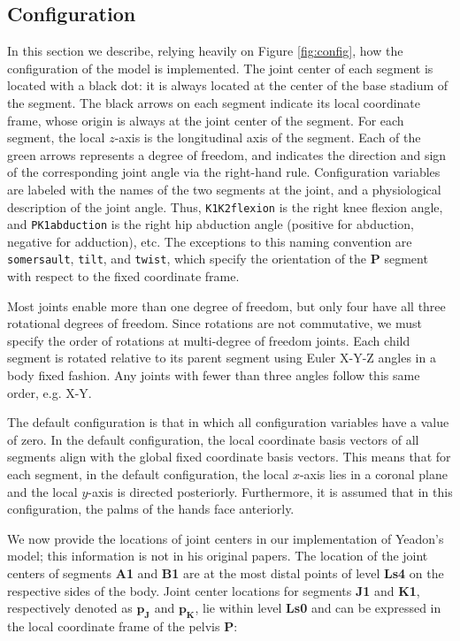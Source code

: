 \documentclass[10pt,a4paper,twocolumn]{article}
\begin{document}
\subsection*{Configuration}

In this section we describe, relying heavily on Figure \ref{fig:config}, how
the configuration of the model is implemented. The joint center of each segment
is located with a black dot: it is always located at the center of the base
stadium of the segment. The black arrows on each segment indicate its local
coordinate frame, whose origin is always at the joint center of the segment.
For each segment, the local $z$-axis is the longitudinal axis of the segment.
Each of the green arrows represents a degree of freedom, and indicates the
direction and sign of the corresponding joint angle via the right-hand rule.
Configuration variables are labeled with the names of the two segments at the
joint, and a physiological description of the joint angle. Thus,
\verb+K1K2flexion+ is the right knee flexion angle, and \verb+PK1abduction+ is
the right hip abduction angle (positive for abduction, negative for adduction),
etc. The exceptions to this naming convention are \verb+somersault+,
\verb+tilt+, and \verb+twist+, which specify the orientation of the \textbf{P}
segment with respect to the fixed coordinate frame.

Most joints enable more than one degree of freedom, but only four have all
three rotational degrees of freedom. Since rotations are not commutative,  we
must specify the order of rotations at multi-degree of freedom joints. Each
child segment is rotated relative to its parent segment using Euler X-Y-Z
angles in a body fixed fashion. Any joints with fewer than three angles follow
this same order, e.g. X-Y.

The default configuration is that in which all configuration variables have a
value of zero. In the default configuration, the local coordinate basis vectors
of all segments align with the global fixed coordinate basis vectors. This
means that for each segment, in the default configuration, the local $x$-axis
lies in a coronal plane and the local $y$-axis is directed posteriorly.
Furthermore, it is assumed that in this configuration, the palms of the hands
face anteriorly.

We now provide the locations of joint centers in our implementation of Yeadon's
model; this information is not in his original papers. The location of the
joint centers of segments \textbf{A1} and \textbf{B1} are at the most distal
points of level \textbf{Ls4} on the respective sides of the body. Joint center
locations for segments \textbf{J1} and \textbf{K1}, respectively denoted as
$\mathbf{p_J}$ and $\mathbf{p_K}$, lie within level \textbf{Ls0} and can be
expressed in the local coordinate frame of the pelvis \textbf{P}:
\end{document}
